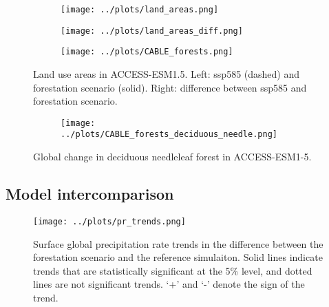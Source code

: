 \documentclass[]{article}
\begin{document}

\begin{figure}[H]
    \centering
    \begin{subfigure}[b]{0.45\linewidth}
        \texttt{[image: ../plots/land\_areas.png]}
    \end{subfigure}
    \begin{subfigure}[b]{0.45\linewidth}
        \texttt{[image: ../plots/land\_areas\_diff.png]}
    \end{subfigure}
    \begin{subfigure}[b]{0.45\linewidth}
        \texttt{[image: ../plots/CABLE\_forests.png]}
    \end{subfigure}
    \caption{Land use areas in ACCESS-ESM1.5. Left: ssp585 (dashed) and forestation scenario (solid). Right: difference between ssp585 and forestation scenario.}
    \label{fig:ACCESS_land_use}
\end{figure}

\begin{figure}[H]
    \centering
    \begin{subfigure}[b]{0.45\linewidth}
        \texttt{[image: ../plots/CABLE\_forests\_deciduous\_needle.png]}
    \end{subfigure}
    \caption{Global change in deciduous needleleaf forest in ACCESS-ESM1-5.}
    \label{fig:ACCESS_dec_needle_cover}
\end{figure}

\subsection{Model intercomparison}

\begin{figure}[H]
    \centering
    \texttt{[image: ../plots/pr\_trends.png]}
    \caption{Surface global precipitation rate trends in the difference between the forestation scenario and the reference simulaiton. Solid lines indicate trends that are statistically significant at the 5\% level, and dotted lines are not significant trends. `+' and `-' denote the sign of the trend.}
    \label{fig:models_pr_trends}
\end{figure}
\end{document}
